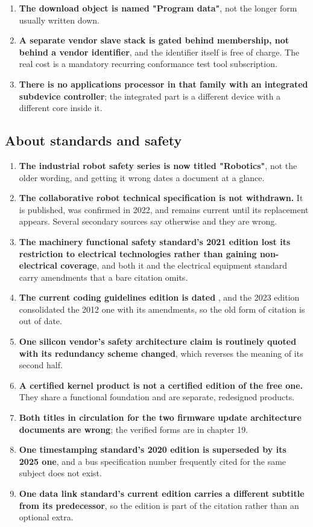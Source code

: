 \begin{enumerate}[resume,itemsep=2pt]
{on Friday 7 May 2021}; the claim that a particular successor superseded it could
not be confirmed.
\item \textbf{The download object is named "Program data"}, not the longer form
usually written down.
\item \textbf{A separate vendor slave stack is gated behind membership, not
behind a vendor identifier}, and the identifier itself is free of charge. The
real cost is a mandatory recurring conformance test tool subscription.
\item \textbf{There is no applications processor in that family with an
integrated subdevice controller}; the integrated part is a different device with
a different core inside it.
\end{enumerate}

\subsection*{About standards and safety}

\begin{enumerate}[resume,itemsep=2pt]
\item \textbf{The industrial robot safety series is now titled "Robotics"},
not the older wording, and getting it wrong dates a document at a glance.
\item \textbf{The collaborative robot technical specification is not
withdrawn.} It is published, was confirmed in 2022, and remains current until
its replacement appears. Several secondary sources say otherwise and they are
wrong.
\item \textbf{The machinery functional safety standard's 2021 edition lost its
restriction to electrical technologies rather than gaining non-electrical
coverage}, and both it and the electrical equipment standard carry amendments
that a bare citation omits.
\item \textbf{The current coding guidelines edition is dated }, and
the 2023 edition consolidated the 2012 one with its amendments, so the old form
of citation is out of date.
\item \textbf{One silicon vendor's safety architecture claim is routinely quoted
with its redundancy scheme changed}, which reverses the meaning of its second
half.
\item \textbf{A certified kernel product is not a certified edition of the free
one.} They share a functional foundation and are separate, redesigned products.
\item \textbf{Both titles in circulation for the two firmware update
architecture documents are wrong}; the verified forms are in chapter 19.
\item \textbf{One timestamping standard's 2020 edition is superseded by its 2025
one}, and a bus specification number frequently cited for the same subject does
not exist.
\item \textbf{One data link standard's current edition carries a different
subtitle from its predecessor}, so the edition is part of the citation rather
than an optional extra.
\end{enumerate}

